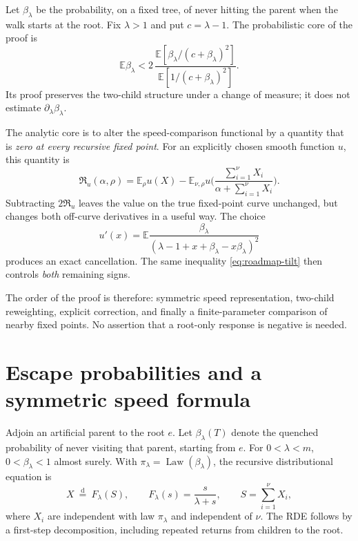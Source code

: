 \documentclass[11pt,a4paper]{article}
\numberwithin{equation}{section}
\theoremstyle{notethm}
\theoremstyle{definition}
\newcommand{\E}{\mathbb E}
\newcommand{\Law}{\operatorname{Law}}
\newcommand{\res}{\mathfrak R}
\begin{document}
Let $\beta_\lambda$ be the probability, on a fixed tree, of never hitting the
parent when the walk starts at the root. Fix $\lambda>1$ and put $c=\lambda-1$.
The probabilistic core of the proof is
\begin{equation}\label{eq:roadmap-tilt}
 \boxed{\quad
 \E\beta_\lambda
 <2\,
 \frac{\E[\beta_\lambda/(c+\beta_\lambda)^2]}
      {\E[1/(c+\beta_\lambda)^2]}.
 \quad}
\end{equation}
Its proof preserves the two-child structure under a change of measure; it
does not estimate $\partial_\lambda\beta_\lambda$.

The analytic core is to alter the speed-comparison functional by a quantity
that is \emph{zero at every recursive fixed point}. For an explicitly chosen
smooth function $u$, this quantity is
\begin{equation}\label{eq:roadmap-residual}
 \res_u(\alpha,\rho)
 =\E_\rho u(X)
  -\E_{\nu,\rho}u\biggl(
      \frac{\sum_{i=1}^{\nu}X_i}{\alpha+\sum_{i=1}^{\nu}X_i}
    \biggr).
\end{equation}
Subtracting $2\res_u$ leaves the value on the true fixed-point curve unchanged,
but changes both off-curve derivatives in a useful way. The choice
\begin{equation}\label{eq:roadmap-corrector}
 u'(x)=\E\frac{\beta_\lambda}
 {(\lambda-1+x+\beta_\lambda-x\beta_\lambda)^2}
\end{equation}
produces an exact cancellation. The same inequality
\eqref{eq:roadmap-tilt} then controls \emph{both} remaining signs.

The order of the proof is therefore: symmetric speed representation,
two-child reweighting, explicit correction, and finally a finite-parameter
comparison of nearby fixed points. No assertion that a root-only response is
negative is needed.

\section{Escape probabilities and a symmetric speed formula}\label{sec:reduction}

Adjoin an artificial parent to the root $e$. Let $\beta_\lambda(T)$ denote the
quenched probability of never visiting that parent, starting from $e$.
For $0<\lambda<m$, $0<\beta_\lambda<1$ almost surely. With
$\pi_\lambda=\Law(\beta_\lambda)$, the recursive distributional equation is
\begin{equation}\label{eq:rde}
 X\ \overset{\mathrm d}=\ F_\lambda(S),\qquad
 F_\lambda(s)=\frac{s}{\lambda+s},\qquad
 S=\sum_{i=1}^{\nu}X_i,
\end{equation}
where $X_i$ are independent with law $\pi_\lambda$ and independent of $\nu$.
The RDE follows by a first-step decomposition, including repeated returns
from children to the root.
\end{document}
